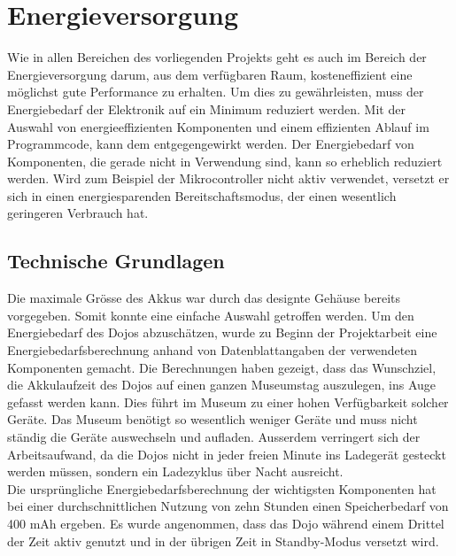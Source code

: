 \chapter{Energieversorgung}
\label{Energieversorgung}
\thispagestyle{fancy} 

Wie in allen Bereichen des vorliegenden Projekts geht es auch im Bereich der Energieversorgung darum, aus dem verfügbaren Raum, kosteneffizient eine möglichst gute Performance zu erhalten. Um dies zu gewährleisten, muss der Energiebedarf der Elektronik auf ein Minimum reduziert werden. Mit der Auswahl von energieeffizienten Komponenten und einem effizienten Ablauf im Programmcode, kann dem entgegengewirkt werden. Der Energiebedarf von Komponenten, die gerade nicht in Verwendung sind, kann so erheblich reduziert werden. Wird zum Beispiel der Mikrocontroller nicht aktiv verwendet, versetzt er sich in einen energiesparenden Bereitschaftsmodus, der einen wesentlich geringeren Verbrauch hat.

\section{Technische Grundlagen}
 
Die maximale Grösse des Akkus war durch das designte Gehäuse bereits vorgegeben. Somit konnte eine einfache Auswahl getroffen werden. Um den Energiebedarf des Dojos abzuschätzen, wurde zu Beginn der Projektarbeit eine Energiebedarfsberechnung anhand von Datenblattangaben der verwendeten Komponenten gemacht. Die Berechnungen haben gezeigt, dass das Wunschziel, die Akkulaufzeit des Dojos auf einen ganzen Museumstag auszulegen, ins Auge gefasst werden kann. Dies führt im Museum zu einer hohen Verfügbarkeit solcher Geräte.  Das Museum benötigt so wesentlich weniger Geräte und muss nicht ständig die Geräte auswechseln und aufladen. Ausserdem verringert sich der Arbeitsaufwand, da die Dojos nicht in jeder freien Minute ins Ladegerät gesteckt werden müssen, sondern ein Ladezyklus über Nacht ausreicht.\\

Die ursprüngliche Energiebedarfsberechnung der wichtigsten Komponenten hat bei einer durchschnittlichen Nutzung von zehn Stunden einen Speicherbedarf von 400 mAh ergeben. Es wurde angenommen, dass das Dojo während einem Drittel der Zeit aktiv genutzt und in der übrigen Zeit in Standby-Modus versetzt wird. 



